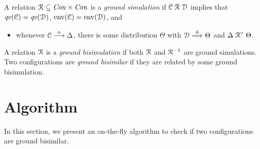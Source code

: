 \documentclass[a4paper,UKenglish,cleveref, autoref]{lipics-v2019}
\newcommand{\ptr}{{\rm env}}
\newcommand{\lift}[1]{\mathrel{{#1}^\circ}}
\newcommand{\Con}{{\it Con}}
\newcommand{\qv}{{\it qv}}
\newcommand{\CC}{{\cal C}}
\newcommand{\CD}{{\cal D}}
\begin{document}
\begin{definition}[\cite{DF12}]
	A relation $\aRel\ \subseteq \Con\times\Con$ is a \emph{ground simulation} if
	$\CC\aRel \CD$ implies that $\qv(\CC)=\qv(\CD)$, $\ptr(\CC)=\ptr(\CD)$,
	and
	\begin{itemize}
		\item whenever $\CC\ar{\alpha} \Delta$, there is some distribution $\Theta$ with $\CD\dar{\hat{\alpha}}\Theta$ and $\Delta \lift{\aRel} \Theta$.
	\end{itemize}
	A relation $\mathrel{{\mathcal R }}$ is a \emph{ground bisimulation} if both $\mathrel{{\mathcal R }}$ and
	$\mathrel{{\mathcal R }}^{-1}$ are ground simulations. Two configurations are \emph{ground bisimilar} if they are related by some ground bisimulation.
\end{definition}

\section{Algorithm}
In this section, we present an on-the-fly algorithm to check if two configurations are ground bisimilar.
\end{document}
